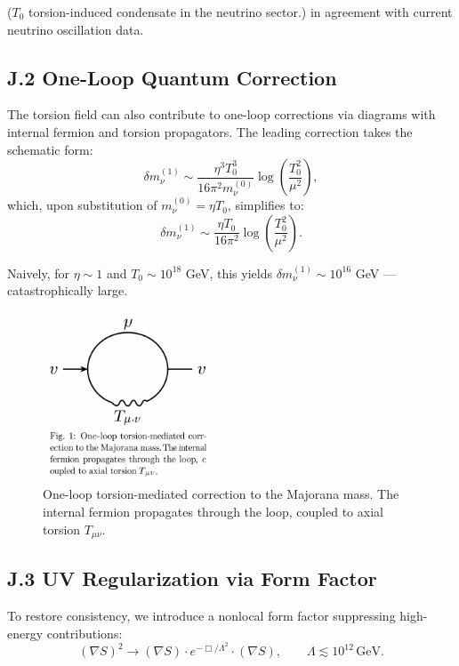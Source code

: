 \documentclass{article}
\begin{document}
($T_0$ torsion-induced condensate in the neutrino sector.)
in agreement with current neutrino oscillation data.

\subsection*{J.2 One-Loop Quantum Correction}
The torsion field can also contribute to one-loop corrections via diagrams with internal fermion and torsion propagators. The leading correction takes the schematic form:
\begin{equation}
\delta m_\nu^{(1)} \sim \frac{\eta^3 T_0^3}{16\pi^2 m_\nu^{(0)}} \log \left( \frac{T_0^2}{\mu^2} \right),
\end{equation}
which, upon substitution of $m_\nu^{(0)} = \eta T_0$, simplifies to:
\begin{equation}
\delta m_\nu^{(1)} \sim \frac{\eta T_0}{16\pi^2} \log \left( \frac{T_0^2}{\mu^2} \right).
\end{equation}

Naively, for $\eta \sim 1$ and $T_0 \sim 10^{18}$ GeV, this yields $\delta m_\nu^{(1)} \sim 10^{16}$ GeV — catastrophically large.

\begin{figure}[h!]
\centering
\includegraphics[width=0.45\textwidth]{Fig.J.1.png}
\caption{One-loop torsion-mediated correction to the Majorana mass. The internal fermion propagates through the loop, coupled to axial torsion \( T_{\mu\nu} \).}
\label{fig:torsion_loop}
\end{figure}




\subsection*{J.3 UV Regularization via Form Factor}
To restore consistency, we introduce a nonlocal form factor suppressing high-energy contributions:
\begin{equation}
(\nabla S)^2 \rightarrow 
(\nabla S) \cdot e^{-\Box/\Lambda^2} \cdot (\nabla S),
\qquad \Lambda \lesssim 10^{12}\,\text{GeV}.
\end{equation}
\end{document}
